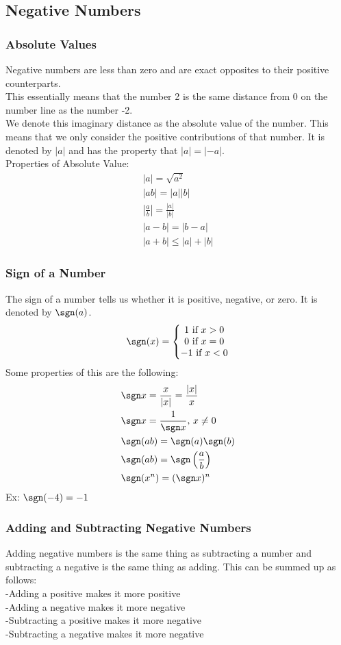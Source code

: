\subsection{Negative Numbers}

\subsubsection{Absolute Values}
Negative numbers are less than zero and are exact opposites to their positive counterparts.\\
This essentially means that the number 2 is the same distance from 0 on the number line as the number -2.\\
We denote this imaginary distance as the absolute value of the number. This means that we only consider the positive contributions of that number. It is denoted by $|a|$ and has the property that $|a|=|-a|$.\\
Properties of Absolute Value:
\begin{align*}
    |a|=\sqrt{a^2}\\
    |ab|=|a||b|\\
    \left|\frac{a}{b}\right|=\frac{|a|}{|b|}\\
    |a-b|=|b-a|\\
    |a+b|\leq|a|+|b|
\end{align*}

\subsubsection{Sign of a Number}
The sign of a number tells us whether it is positive, negative, or zero. It is denoted by $\sgn(a)$.
$$\sgn(x)=\left\{\begin{matrix}
1\text{ if }x>0\\
0\text{ if }x=0\\
-1\text{ if }x<0
\end{matrix}\right.$$
Some properties of this are the following:
\begin{align*}
    &\sgn x=\frac{x}{|x|}=\frac{|x|}{x}\\
    &\sgn x=\frac{1}{\sgn x},\,x\neq 0\\
    &\sgn(ab)=\sgn(a)\sgn(b)\\
    &\sgn(ab)=\sgn\left(\frac{a}{b}\right)\\
    &\sgn(x^n)=(\sgn x)^n
\end{align*}
Ex: $\sgn(-4)=-1$

\subsubsection{Adding and Subtracting Negative Numbers}
Adding negative numbers is the same thing as subtracting a number and subtracting a negative is the same thing as adding. This can be summed up as follows:\\
-Adding a positive makes it more positive\\
-Adding a negative makes it more negative\\
-Subtracting a positive makes it more negative\\
-Subtracting a negative makes it more negative

